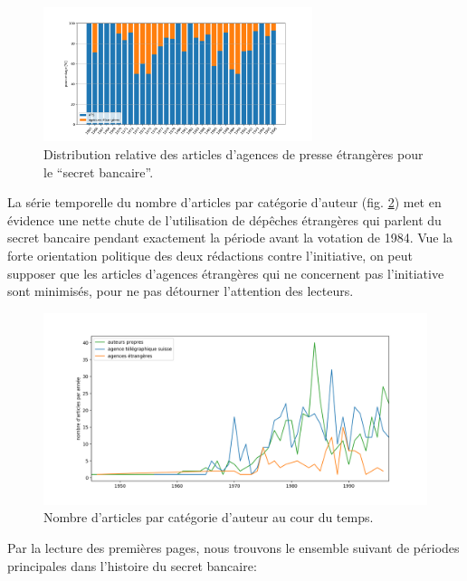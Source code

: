 \documentclass[a4paper, 11pt]{article}
\begin{document}
\begin{figure}
\centering
\includegraphics[width=0.7\textwidth ]{analysis/agency_percentage.png}
\caption{\label{percentage1} Distribution relative des articles
d'agences de presse étrangères pour le ``secret bancaire''.}
\end{figure}

La série temporelle du nombre d'articles par catégorie d'auteur (fig.
\ref{categorie}) met en évidence une nette chute de l'utilisation de
dépêches étrangères qui parlent du secret bancaire pendant exactement la
période avant la votation de 1984. Vue la forte orientation politique
des deux rédactions contre l'initiative, on peut supposer que les
articles d'agences étrangères qui ne concernent pas l'initiative sont
minimisés, pour ne pas détourner l'attention des lecteurs.

\begin{figure}
\centering
\includegraphics[width=1\textwidth ]{analysis/authors_agency_count.png}
\caption{\label{categorie} Nombre d'articles par catégorie d'auteur au
cour du temps.}
\end{figure}

Par la lecture des premières pages, nous trouvons le ensemble suivant de
périodes principales dans l'histoire du secret bancaire:
\end{document}
